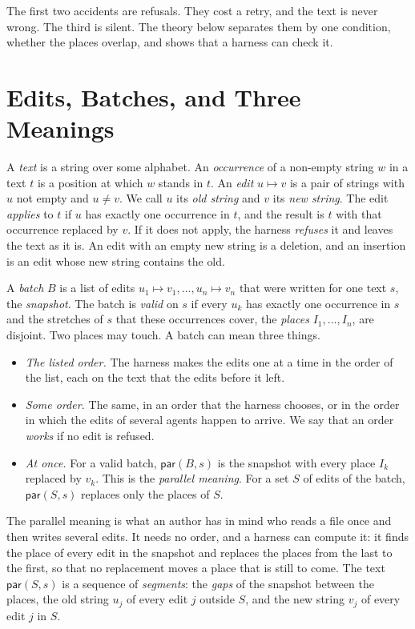 \documentclass[acmsmall,nonacm,screen]{acmart}
\newcommand{\kw}[1]{\mathsf{#1}}
\newcommand{\Par}{\kw{par}}
\begin{document}
The first two accidents are refusals. They cost a retry, and the text is never wrong. The
third is silent. The theory below separates them by one condition, whether the places
overlap, and shows that a harness can check it.

\section{Edits, Batches, and Three Meanings}\label{sec:batches}

A \emph{text} is a string over some alphabet. An \emph{occurrence} of a non-empty string $w$
in a text $t$ is a position at which $w$ stands in $t$. An \emph{edit} $u \mapsto v$ is a
pair of strings with $u$ not empty and $u \ne v$. We call $u$ its \emph{old string} and $v$
its \emph{new string}. The edit \emph{applies} to $t$ if $u$ has exactly one occurrence in
$t$, and the result is $t$ with that occurrence replaced by $v$. If it does not apply, the
harness \emph{refuses} it and leaves the text as it is. An edit with an empty new string is a
deletion, and an insertion is an edit whose new string contains the old.

A \emph{batch} $B$ is a list of edits $u_1 \mapsto v_1, \ldots, u_n \mapsto v_n$ that were
written for one text $s$, the \emph{snapshot}. The batch is \emph{valid} on $s$ if every
$u_k$ has exactly one occurrence in $s$ and the stretches of $s$ that these occurrences
cover, the \emph{places} $I_1, \ldots, I_n$, are disjoint. Two places may touch. A batch can
mean three things.
\begin{itemize}
\item \emph{The listed order.} The harness makes the edits one at a time in the order of the
  list, each on the text that the edits before it left.
\item \emph{Some order.} The same, in an order that the harness chooses, or in the order in
  which the edits of several agents happen to arrive. We say that an order \emph{works} if no
  edit is refused.
\item \emph{At once.} For a valid batch, $\Par(B, s)$ is the snapshot with every place $I_k$
  replaced by $v_k$. This is the \emph{parallel meaning}. For a set $S$ of edits of the
  batch, $\Par(S, s)$ replaces only the places of $S$.
\end{itemize}

The parallel meaning is what an author has in mind who reads a file once and then writes
several edits. It needs no order, and a harness can compute it: it finds the place of every
edit in the snapshot and replaces the places from the last to the first, so that no
replacement moves a place that is still to come. The text $\Par(S, s)$ is a sequence of
\emph{segments}: the \emph{gaps} of the snapshot between the places, the old string $u_j$ of
every edit $j$ outside $S$, and the new string $v_j$ of every edit $j$ in $S$.
\end{document}
